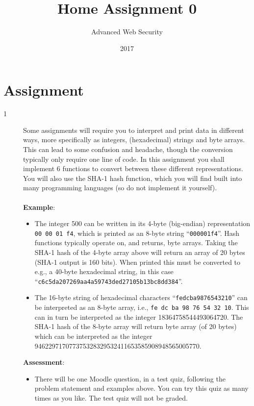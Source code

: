 \documentclass{article}
\begin{document}
\title{Home Assignment 0}
\author{Advanced Web Security}
\date{2017}

\maketitle

\section*{Assignment}

\begin{description}

	\item[1~~~]{Some assignments will require you to interpret and print data in different ways, more specifically as integers, 
		(hexadecimal) strings and byte arrays. This can lead to some confusion and headache, though the conversion typically only require one line of code. 
		In this assignment you shall implement 6 functions to convert between these different representations. 
		You will also use the SHA-1 hash function, which you will find built into many programming languages (so do not implement it yourself).\\\\
    \textbf{Example}:
    
	\begin{itemize}
    
		\item The integer 500 can be written in its 4-byte (big-endian) representation \texttt{00 00 01 f4}, 
			which is printed as an 8-byte string ``\texttt{000001f4}''. Hash functions typically operate on, and returns, byte arrays. 
			Taking the SHA-1 hash of the 4-byte array above will return an array of 20 bytes (SHA-1 output is 160 bits). 
			When printed this must be converted to e.g., a 40-byte hexadecimal string, in this case ``\texttt{c6c5da207269aa4a59743ded27105b13bc8dd384}''.

    
		\item The 16-byte string of hexadecimal characters ``\texttt{fedcba9876543210}'' can be interpreted as an 8-byte array, 
			i.e., \texttt{fe dc ba 98 76 54 32 10}. This can in turn be interpreted as the integer 18364758544493064720. 
			The SHA-1 hash of the 8-byte array will return byte array (of 20 bytes) which can be interpreted as the integer 946229717077375328329532411653585908948565005770.
    \end{itemize}
	
	\textbf{Assessment}:
	\begin{itemize}
		
		\item There will be one Moodle question, in a test quiz, following the problem statement and examples above. You can try this quiz as many times as you like. The test quiz will not be graded.
	\end{itemize}
	}

\end{description}
\end{document}

